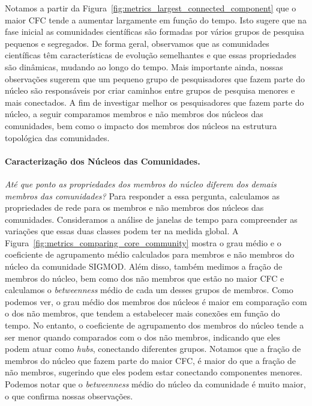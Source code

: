 \documentclass[12pt]{article}
\begin{document}
Notamos a partir da Figura~\ref{fig:metrics_largest_connected_component} que o maior CFC tende a aumentar largamente em função do 
tempo. Isto sugere que na fase inicial as comunidades científicas são formadas por vários grupos de pesquisa pequenos 
e segregados. De forma geral, observamos que as comunidades científicas têm características de evolução semelhantes e que essas 
propriedades são dinâmicas, mudando ao longo do tempo. Mais importante ainda, nossas observações sugerem que 
um pequeno grupo de pesquisadores que fazem parte do núcleo são responsáveis por criar caminhos entre grupos de 
pesquisa menores e mais conectados. A fim de investigar melhor os pesquisadores que fazem parte do núcleo, 
a seguir comparamos membros e não membros dos núcleos das comunidades, bem como o impacto dos membros dos núcleos na estrutura
topológica das comunidades.

\vspace{-0.6cm}
\noindent
\paragraph{Caracterização dos Núcleos das Comunidades.}
\textit{Até que ponto as propriedades dos membros do núcleo diferem dos demais membros das comunidades?} Para responder a essa 
pergunta, calculamos as propriedades de rede para os membros e não membros dos núcleos das comunidades. Consideramos 
a análise de janelas de tempo para compreender as variações que essas duas classes podem ter na medida global. 
A Figura~\ref{fig:metrics_comparing_core_community} mostra o grau médio e o coeficiente de agrupamento médio calculados para 
membros e não membros do núcleo da comunidade SIGMOD. Além disso, 
também medimos a fração de membros do núcleo, bem como dos não membros que estão no maior CFC e calculamos 
o \textit{betweenness} médio de cada um desses grupos de membros.
Como podemos ver, o grau médio dos membros dos núcleos é maior em 
comparação com o dos não membros, que tendem a estabelecer mais conexões em função do tempo.
No entanto, o coeficiente de agrupamento dos membros do núcleo tende a ser 
menor quando comparados com o dos não membros, indicando que eles podem atuar como \textit{hubs}, conectando 
diferentes grupos. Notamos que a fração de membros do núcleo que fazem parte do maior 
CFC, é maior do que a fração de não membros, sugerindo que eles podem estar conectando componentes 
menores. Podemos notar que o \textit{betweenness} médio do núcleo da comunidade é muito maior, 
o que confirma nossas observações.
\end{document}
